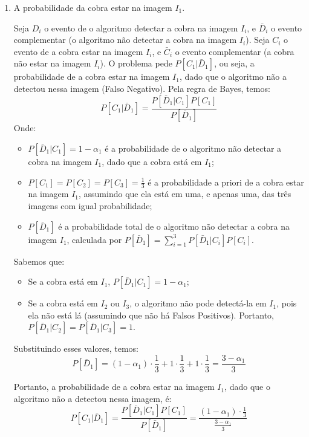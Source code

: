 \documentclass[12 pt]{article}
\begin{document}
\newpage
\begin{enumerate}
    \item A probabilidade da cobra estar na imagem $I_1$.
    \begin{tcolorbox}[colframe=black, title=Resposta:]
        Seja $D_i$ o evento de o algoritmo detectar a cobra na imagem $I_i$, e $\bar{D}_i$ o evento complementar (o algoritmo não detectar a cobra na imagem $I_i$). Seja $C_i$ o evento de a cobra estar na imagem $I_i$, e $\bar{C}_i$ o evento complementar (a cobra não estar na imagem $I_i$). O problema pede $P[C_1 | \bar{D}_1]$, ou seja, a probabilidade de a cobra estar na imagem $I_1$, dado que o algoritmo não a detectou nessa imagem (Falso Negativo). Pela regra de Bayes, temos:
        $$
        P[C_1 | \bar{D}_1] = \frac{P[\bar{D}_1 | C_1]P[C_1]}{P[\bar{D}_1]}
        $$
        Onde:
        \begin{itemize}
            \item $P[\bar{D}_1 | C_1] = 1 - \alpha_1$ é a probabilidade de o algoritmo não detectar a cobra na imagem $I_1$, dado que a cobra está em $I_1$;
            \item $P[C_1] = P[C_2] = P[C_3] = \frac{1}{3}$ é a probabilidade a priori de a cobra estar na imagem $I_1$, assumindo que ela está em uma, e apenas uma, das três imagens com igual probabilidade;
            \item $P[\bar{D}_1]$ é a probabilidade total de o algoritmo não detectar a cobra na imagem $I_1$, calculada por $ P[\bar{D}_1] = \sum_{i=1}^{3} P[\bar{D}_1 | C_i]P[C_i]$.
        \end{itemize}

        Sabemos que:
        \begin{itemize}
            \item Se a cobra está em $I_1$, $P[\bar{D}_1 | C_1] = 1 - \alpha_1$;
            \item Se a cobra está em $I_2$ ou $I_3$, o algoritmo não pode detectá-la em $I_1$, pois ela não está lá (assumindo que não há Falsos Positivos). Portanto, $P[\bar{D}_1 | C_2] = P[\bar{D}_1 | C_3] = 1$.
        \end{itemize}

        Substituindo esses valores, temos:
        $$
        P[\bar{D}_1] = (1 - \alpha_1) \cdot \frac{1}{3} + 1 \cdot \frac{1}{3} + 1 \cdot \frac{1}{3} = \frac{3 - \alpha_1}{3}
        $$

        Portanto, a probabilidade de a cobra estar na imagem $I_1$, dado que o algoritmo não a detectou nessa imagem, é:
        $$
        P[C_1 | \bar{D}_1] = \frac{P[\bar{D}_1 | C_1]P[C_1]}{P[\bar{D}_1]} = \frac{(1 - \alpha_1) \cdot \frac{1}{3}}{\frac{3 - \alpha_1}{3}} $$


\end{tcolorbox}
\end{enumerate}
\end{document}
